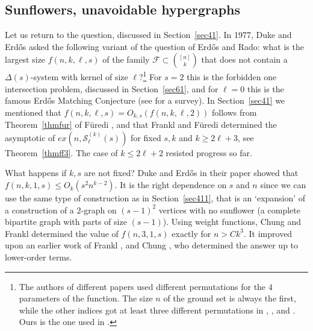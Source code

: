\documentclass[graybox]{svmult}
\renewcommand{\le}{\leqslant}
\renewcommand{\ge}{\geqslant}
\newcommand{\ff}{\mathcal{F}}
\newcommand{\m}{\mathcal}
\begin{document}
\subsection{Sunflowers, unavoidable hypergraphs}
Let us return to the question, discussed in Section~\ref{sec41}. In 1977, Duke and Erd\H os \cite{DE} asked the following variant of the question of Erd\H os and Rado: what is the largest size $f(n,k,\ell,s)$ of the family $\ff\subset {[n]\choose k}$ that does not contain a $\Delta(s)$-system with kernel of size $\ell$?\footnote{The authors of different papers used different permutations for the $4$ parameters of the function. The size $n$ of the ground set is always the first, while the other indices got at least three different permutations in \cite{DE}, \cite{Fra78b}, and \cite{FF2}. Ours is the one used in \cite{FF2}.} For $s=2$ this is the forbidden one intersection problem, discussed in Section~\ref{sec61}, and for $\ell=0$ this is the famous Erd\H os Matching Conjecture \cite{E} (see \cite{FK21} for a survey). In Section~\ref{sec41} we mentioned that $f(n,k,\ell,s)=O_{k,s} (f(n,k,\ell,2))$ follows from Theorem~\ref{thmfur} of F\"uredi \cite{Fu1}, and that Frankl and F\"uredi determined the asymptotic of $ex(n, \m S^{(k)}_\ell(s))$ for fixed $s,k$ and $k\ge 2\ell+3$, see Theorem~\ref{thmff3}. The case of $k\le 2\ell+2$ resisted progress so far.

What happens if $k,s$ are not fixed? Duke and Erd\H os \cite{DE} in their paper showed that $f(n,k,1,s)\le O_k(s^2 n^{k-2}).$ It is the right dependence on $s$ and $n$ since we can use the same type of construction as in Section~\ref{sec411}, that is an `expansion' of a construction of a $2$-graph on $(s-1)^2$ vertices with no sunflower (a complete bipartite graph with parts of size $(s-1)$). Using weight functions, Chung and Frankl \cite{CF} determined the value of $f(n,3,1,s)$ exactly for $n>Ck^3$. It improved upon an earlier work of Frankl \cite{Fra78b}, and Chung \cite{Ch}, who determined the answer up to lower-order terms.
\end{document}
